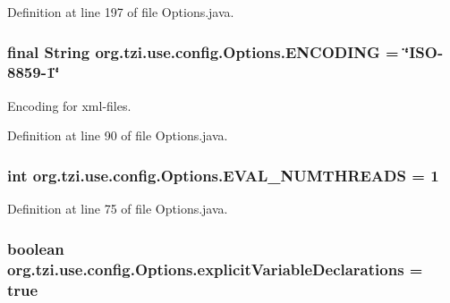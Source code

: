 Definition at line 197 of file Options.\-java.

\hypertarget{classorg_1_1tzi_1_1use_1_1config_1_1_options_aa4d8c50f686c77078a30b5f3c1a77600}{
\subsubsection[{E\-N\-C\-O\-D\-I\-N\-G}]{\setlength{\rightskip}{0pt plus 5cm}final String org.\-tzi.\-use.\-config.\-Options.\-E\-N\-C\-O\-D\-I\-N\-G = \char`\"{}I\-S\-O-\/8859-\/1\char`\"{}\hspace{0.3cm}{\ttfamily [static]}}}\label{classorg_1_1tzi_1_1use_1_1config_1_1_options_aa4d8c50f686c77078a30b5f3c1a77600}
Encoding for xml-\/files. 

Definition at line 90 of file Options.\-java.

\hypertarget{classorg_1_1tzi_1_1use_1_1config_1_1_options_a32a63c54041582a986ef1834ffa66c5a}{
\subsubsection[{E\-V\-A\-L\-\_\-\-N\-U\-M\-T\-H\-R\-E\-A\-D\-S}]{\setlength{\rightskip}{0pt plus 5cm}int org.\-tzi.\-use.\-config.\-Options.\-E\-V\-A\-L\-\_\-\-N\-U\-M\-T\-H\-R\-E\-A\-D\-S = 1\hspace{0.3cm}{\ttfamily [static]}}}\label{classorg_1_1tzi_1_1use_1_1config_1_1_options_a32a63c54041582a986ef1834ffa66c5a}


Definition at line 75 of file Options.\-java.

\hypertarget{classorg_1_1tzi_1_1use_1_1config_1_1_options_a84fcb768828dbb675d8db2f6d90674c7}{
\subsubsection[{explicit\-Variable\-Declarations}]{\setlength{\rightskip}{0pt plus 5cm}boolean org.\-tzi.\-use.\-config.\-Options.\-explicit\-Variable\-Declarations = true\hspace{0.3cm}{\ttfamily [static]}}}\label{classorg_1_1tzi_1_1use_1_1config_1_1_options_a84fcb768828dbb675d8db2f6d90674c7}


